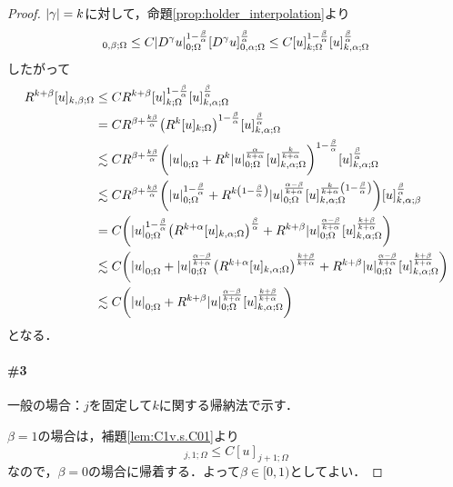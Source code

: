 \documentclass[a4paper]{ltjsarticle}
\newcommand{\Om}{\Omega}
\newcommand{\1}{\mathbbm{1}}
\numberwithin{equation}{section}
\theoremstyle{definition}
\begin{document}
\begin{proof}
    $\abs{\gamma}=k$に対して，命題\ref{prop:holder_interpolation}より
    \begin{equation}
        [D^\gamma u]_{0,\beta;\Om}\leq C\abs{D^\gamma u}_{0;\Om}^{1-\frac{\beta}{\alpha}}[D^\gamma u]_{0,\alpha;\Om}^{\frac{\beta}{\alpha}}\leq C[u]_{k;\Om}^{1-\frac{\beta}{\alpha}}[u]_{k,\alpha;\Om}^{\frac{\beta}{\alpha}} 
    \end{equation}
    したがって
    \begin{align}
        R^{k+\beta}[u]_{k,\beta;\Om}
        &\leq CR^{k+\beta}[u]_{k;\Om}^{1-\frac{\beta}{\alpha}}[u]_{k,\alpha;\Om}^{\frac{\beta}{\alpha}}\\
        &=CR^{\beta+\frac{k\beta}{\alpha}}\qty(R^k[u]_{k;\Om})^{1-\frac{\beta}{\alpha}}[u]_{k,\alpha;\Om}^{\frac{\beta}{\alpha}}\\
        &\lesssim CR^{\beta+\frac{k\beta}{\alpha}}\qty(\abs{u}_{0;\Om}+R^k\abs{u}_{0;\Om}^{\frac{\alpha}{k+\alpha}}[u]_{k,\alpha;\Om}^{\frac{k}{k+\alpha}})^{1-\frac{\beta}{\alpha}}[u]_{k,\alpha;\Om}^{\frac{\beta}{\alpha}}\\
        &\lesssim CR^{\beta+\frac{k\beta}{\alpha}}\qty(\abs{u}_{0;\Om}^{1-\frac{\beta}{\alpha}}+R^{k\qty(1-\frac{\beta}{\alpha})}\abs{u}_{0;\Om}^{\frac{\alpha-\beta}{k+\alpha}}[u]_{k,\alpha;\Om}^{\frac{k}{k+\alpha}\qty(1-\frac{\beta}{\alpha})})[u]_{k,\alpha;\beta}^{\frac{\beta}{\alpha}}\\
        &=C\qty(\abs{u}_{0;\Om}^{1-\frac{\beta}{\alpha}}\qty(R^{k+\alpha}[u]_{k,\alpha;\Om})^{\frac{\beta}{\alpha}}+R^{k+\beta}\abs{u}_{0;\Om}^{\frac{\alpha-\beta}{k+\alpha}}[u]_{k,\alpha;\Om}^{\frac{k+\beta}{k+\alpha}})\\
        &\lesssim C\qty(\abs{u}_{0;\Om}+\abs{u}_{0;\Om}^{\frac{\alpha-\beta}{k+\alpha}}\qty(R^{k+\alpha}[u]_{k,\alpha;\Om})^{\frac{k+\beta}{k+\alpha}}+R^{k+\beta}\abs{u}_{0;\Om}^{\frac{\alpha-\beta}{k+\alpha}}[u]_{k,\alpha;\Om}^{\frac{k+\beta}{k+\alpha}})\\
        &\lesssim C\qty(\abs{u}_{0;\Om}+R^{k+\beta}\abs{u}_{0;\Om}^{\frac{\alpha-\beta}{k+\alpha}}[u]_{k,\alpha;\Om}^{\frac{k+\beta}{k+\alpha}})
    \end{align}
    となる．

    \paragraph*{\#3}一般の場合：$j$を固定して$k$に関する帰納法で示す．

    $\beta=1$の場合は，補題\ref{lem:C1v.s.C01}より
    \begin{equation}
        [u]_{j,1;\Om}\leq C[u]_{j+1;\Om} 
    \end{equation}
    なので，$\beta=0$の場合に帰着する．よって$\beta\in [0,1)$としてよい．


\end{proof}
\end{document}
